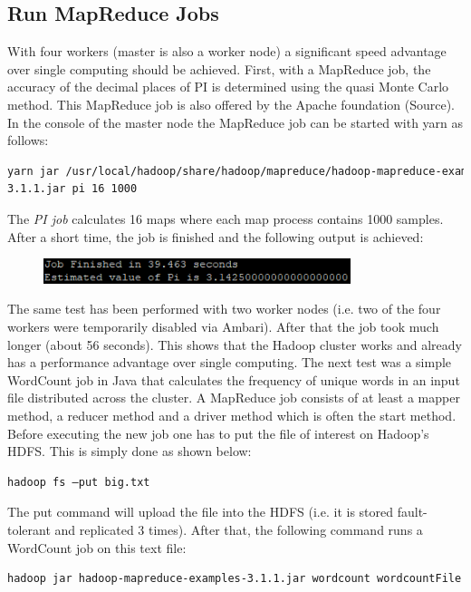 \subsection{Run MapReduce Jobs}
With four workers (master is also a worker node) a significant speed advantage over single computing should be achieved. First, with a MapReduce job, the accuracy of the decimal places of PI is determined using the quasi Monte Carlo method. This MapReduce job is also offered by the Apache foundation (Source). In the console of the master node the MapReduce job can be started with \acs{yarn} as
follows:
\begin{lstlisting}[language=bash,breaklines=true]
yarn jar /usr/local/hadoop/share/hadoop/mapreduce/hadoop-mapreduce-examples-
3.1.1.jar pi 16 1000
\end{lstlisting}
The \emph{PI job} calculates 16 maps where each map process contains 1000 samples. After a short time, the job is finished and the following output is achieved:
\begin{figure}[H]
\hspace{1.2cm}
\includegraphics[width=0.8\textwidth]{img/job}
\label{pic:job}
\end{figure}
\noindent The same test has been performed with two worker nodes (i.e. two of the four workers were temporarily disabled via Ambari). After that the job took much longer (about 56 seconds). This shows that the Hadoop cluster works and already has a performance advantage over single computing. The next test was a simple WordCount job in Java that calculates the frequency of unique words in an input file distributed across the cluster. A MapReduce job consists of at least a mapper method, a reducer method and a driver method which is often the start method. Before executing the new job one has to put the file of interest on Hadoop’s HDFS. This is simply done as shown below:
\begin{lstlisting}[language=bash,breaklines=true]
hadoop fs –put big.txt
\end{lstlisting}
The put command will upload the file into the HDFS (i.e. it is stored fault-tolerant and replicated 3 times). After that, the following command runs a WordCount job on this text file:
\begin{lstlisting}[language=bash,breaklines=true]
hadoop jar hadoop-mapreduce-examples-3.1.1.jar wordcount wordcountFile big.txt
\end{lstlisting}
